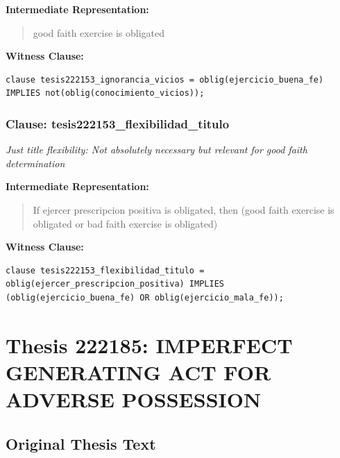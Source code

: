 \documentclass[11pt,a4paper]{article}
\begin{document}
\textbf{Intermediate Representation:}

\begin{quote}
good faith exercise is obligated
\end{quote}

\textbf{Witness Clause:}

\begin{lstlisting}[style=witnessstyle, language=Witness]
clause tesis222153_ignorancia_vicios = oblig(ejercicio_buena_fe) IMPLIES not(oblig(conocimiento_vicios));
\end{lstlisting}

\subsubsection{Clause: tesis222153\_flexibilidad\_titulo}

\textit{Just title flexibility: Not absolutely necessary but relevant for good faith determination}

\textbf{Intermediate Representation:}

\begin{quote}
If ejercer prescripcion positiva is obligated, then (good faith exercise is obligated or bad faith exercise is obligated)
\end{quote}

\textbf{Witness Clause:}

\begin{lstlisting}[style=witnessstyle, language=Witness]
clause tesis222153_flexibilidad_titulo = oblig(ejercer_prescripcion_positiva) IMPLIES (oblig(ejercicio_buena_fe) OR oblig(ejercicio_mala_fe));
\end{lstlisting}

\newpage

\section{Thesis 222185: IMPERFECT GENERATING ACT FOR ADVERSE POSSESSION}
\label{thesis:222185}

\subsection{Original Thesis Text}
\end{document}
